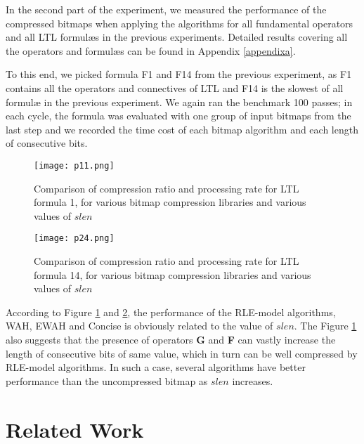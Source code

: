 In the second part of the experiment, we measured the performance of the compressed bitmaps when applying the algorithms for all fundamental operators and all LTL formul\ae{}s in the previous experiments. Detailed results covering all the operators and formul\ae{}s can be found in Appendix \ref{appendixa}.

To this end, we picked formula F1 and F14 from the previous experiment, as F1 contains all the operators and connectives of LTL and F14 is the slowest of all formul\ae{} in the previous experiment. We again ran the benchmark 100 passes; in each cycle, the formula was evaluated with one group of input bitmaps from the last step and we recorded the time cost of each bitmap algorithm and each length of consecutive bits.

\begin{figure}[h]
\begin{center}
\centering
\texttt{[image: p11.png]}
\caption{Comparison of compression ratio and processing rate for LTL formula 1, for various bitmap compression libraries and various values of $slen$}
\label{img:f1}
\end{center}
\end{figure}

\begin{figure}[h]
\begin{center}
\centering
\texttt{[image: p24.png]}
\caption{Comparison of compression ratio and processing rate for LTL formula 14, for various bitmap compression libraries and various values of $slen$}
\label{img:f14}
\end{center}
\end{figure}

According to Figure \ref{img:f1} and \ref{img:f14}, the performance of the RLE-model algorithms, WAH, EWAH and Concise is obviously related to the value of $slen$. The Figure \ref{img:f1} also suggests that the presence of operators \textbf{G} and \textbf{F} can vastly increase the length of consecutive bits of same value, which in turn can be well compressed by RLE-model algorithms. In such a case, several algorithms have better performance than the uncompressed bitmap as $slen$ increases.



\section{Related Work}\label{sec:bm:related} %

